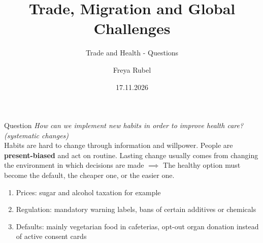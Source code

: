 \documentclass{beamer}
\author{Freya Rubel}
\title{Trade, Migration and Global Challenges}
\subtitle{Trade and Health - Questions}
\institute{}
\date{17.11.2026}
\begin{document}
\begin{frame}
    \titlepage
\end{frame}

\begin{frame}{Question}
    \textit{How can we implement new habits in order to improve health care? (systematic changes)} \pause \vspace{0.5cm}\\
    Habits are hard to change through information and willpower. People are \textbf{present-biased} and act on routine. Lasting change usually comes from changing the environment in which decisions are made $\implies$ The healthy option must become the default, the cheaper one, or the easier one.
\begin{enumerate}\small
  \item Prices: sugar and alcohol taxation for example
  \item Regulation: mandatory warning labels, bans of certain additives or chemicals
  \item Defaults: mainly vegetarian food in cafeterias, opt-out organ donation instead of active consent cards 
\end{enumerate}
\end{frame}

 
\end{document}
